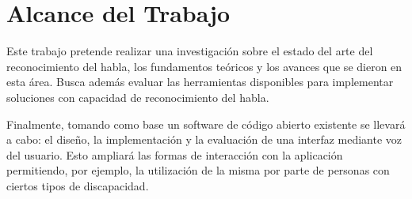 \section{Alcance del Trabajo}
\label{sec:alcance}

Este trabajo pretende realizar una investigaci\'{o}n sobre el estado del arte del reconocimiento del habla, 
los fundamentos te\'{o}ricos y los avances que se dieron en esta \'{a}rea. Busca adem\'{a}s evaluar las 
herramientas disponibles para implementar soluciones con capacidad de reconocimiento del habla. 

Finalmente, tomando como base un software de c\'{o}digo abierto existente se llevar\'{a} a cabo: 
el dise\~{n}o, la implementaci\'{o}n y la evaluaci\'{o}n de una interfaz mediante voz del usuario. 
Esto ampliar\'{a} las formas de interacci\'{o}n con la aplicaci\'{o}n permitiendo, por ejemplo, 
la utilizaci\'{o}n de la misma por parte de personas con ciertos tipos de discapacidad.
